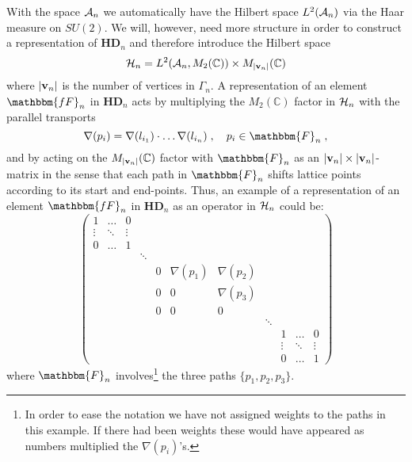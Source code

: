 \documentclass[12pt]{article}
\def\G{\Gamma}
\def\ca{{\cal A}}
\def\ch{{\cal H}}
\begin{document}
With the space $\ca_n$ we automatically have the Hilbert space $L^2(\ca_{n})$ via the Haar measure on $SU(2)$. We will, however, need more structure in order to construct a representation of $\mathbf{HD}_{n}$  and therefore introduce the Hilbert space
$$
\ch_{n} = L^2(\ca_{n}, M_2(\mathbb{C}))\times M_{\vert {\bf v}_n\vert}(\mathbb{C})
$$
where $\vert {\bf v}_n\vert$ is the number of vertices in $\G_n$. A representation of an element $\mathbbm{fF}_n$ in $\mathbf{HD}_{n}$ acts by multiplying the $M_2(\mathbb{C})$ factor in $\ch_n$ with the parallel transports 
$$
\nabla(p_i) = \nabla(l_{i_1})\cdot \ldots\nabla(l_{i_n})\;,\quad p_i \in \mathbbm{F}_n \;,
$$
and by acting on the $M_{\vert {\bf v}_n\vert}(\mathbb{C})$ factor with $\mathbbm{F}_n$ as an $\vert {\bf v}_n\vert \times \vert {\bf v}_n\vert$-matrix in the sense that each path in $\mathbbm{F}_n$ shifts lattice points according to its start and end-points. Thus, an example of a representation of an element $\mathbbm{fF}_n$ in $\mathbf{HD}_{n}$ as an operator in $\ch_n$ could be:
\begin{equation}
\left(
\begin{array}{ccccccccccc}
1 & \ldots & 0 &&&&&&&& \\
\vdots & \ddots & \vdots &&&&&&&&  \\
0 & \ldots & 1 &&&&&&&& \\
&&& \ddots &&&&&&&\\
&&&& 0 & \nabla(p_1) & \nabla(p_2) &&&& \\
&&&& 0 & 0 & \nabla(p_3) &&&& \\
&&&& 0 & 0 & 0 &&&& \\
&&&&&&& \ddots &&& \\
&&&&&&&& 1 & \ldots & 0 \\
&&&&&&&& \vdots & \ddots & \vdots \\
&&&&&&&& 0 & \ldots & 1
\end{array}
\right) 
\label{BigMatrix}
\end{equation}
where $\mathbbm{F}_n$ involves\footnote{In order to ease the notation we have not assigned weights to the paths in this example. If there had been weights these would have appeared as numbers multiplied the $\nabla(p_i)$'s.} the three paths $\{p_1,p_2,p_3\}$.
%
\end{document}
